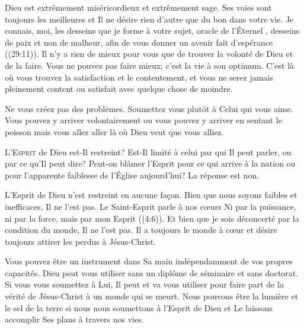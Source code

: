 Dieu est extrêmement miséricordieux et extrêmement sage.
 Ses voies sont toujours les meilleures et Il ne désire rien d'autre
 que du bon dans votre vie.
 \Og Je connais, moi, les desseins que je forme à votre sujet,
 \ocadr oracle de l'Éternel \fcadr{}, desseins de paix et non de malheur,
 afin de vous donner un avenir fait d'espérance \Fg{} ((29:11)).
 Il n'y a rien de mieux pour vous que de trouver la volonté de Dieu
 et de la faire. Vous ne pouvez pas faire mieux; c'est la vie à son optimum.
 C'est là où vous trouvez la satisfaction et le contentement,
 et vous ne serez jamais pleinement content ou satisfait
 avec quelque chose de moindre. 

Ne vous créez pas des problèmes. Soumettez vous plutôt à Celui qui vous aime.
 Vous pouvez y arriver volontairement ou vous pouvez y arriver en sentant
 le poisson \ocadr mais vous allez aller 
 là où Dieu veut que vous alliez. 

\dvrule






\lettrine{L}{'Esprit} de Dieu est-Il restreint?
 Est-Il limité à celui par qui Il peut parler, ou par ce qu'Il peut dire?
 Peut-on blâmer l'Esprit pour ce qui arrive à la nation
 ou pour l'apparente faiblesse de l'Église aujourd'hui? La réponse est non. 


L'Esprit de Dieu n'est restreint en aucune fa\c{c}on.
 Bien que nous soyons faibles et inefficaces, Il ne l'est pas.
 Le Saint-Esprit parle à nos c\oe{}urs\frcolon{} 
 \Og Ni par la puissance, ni par la force, mais par mon Esprit \Fg{}
 ((4:6)).
 Et bien que je sois déconcerté par la condition du monde, Il ne l'est pas.
 Il a toujours le monde à c\oe{}ur et désire toujours attirer
 les perdus à Jésus-Christ. 

Vous pouvez être un instrument dans Sa main indépendamment
 de vos propres capacités. Dieu peut vous utiliser sans un diplôme
 de séminaire et sans doctorat. Si vous vous soumettez à Lui,
 Il peut et va vous utiliser pour faire part de la vérité de Jésus-Christ
 à un monde qui se meurt. Nous pouvons être la lumière
 et le sel de la terre si nous nous soumettons à l'Esprit de Dieu
 et Le laissons accomplir Ses plans à travers nos vies. 

